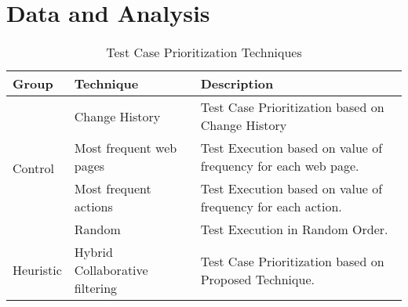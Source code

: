
\section{Data and Analysis}
\label{sec:data1}





\begin{table}[!ht]
	\caption{Test Case Prioritization Techniques}
	\vspace*{-10pt}
	\begin{center}
	 \begin{tabular}{|l|l|l|}		
			\hline
			Group & Technique & Description \\ \hline
			\multirow{4}{*}{Control} 
			& Change History & Test Case Prioritization based on Change History\\
			& Most frequent web pages &  Test Execution based on value of frequency for each web page.\\
			& Most frequent actions &  Test Execution based on value of frequency for each action.\\
			& Random &  Test Execution in Random Order.\\\hline			
			\multirow{1}{*}{Heuristic} 
			& Hybrid Collaborative filtering& Test Case Prioritization based on Proposed Technique. \\\hline		
		\end{tabular}
		\end {center}
		\label{tab:techniques}
	\vspace*{-5pt}
	\end{table}




